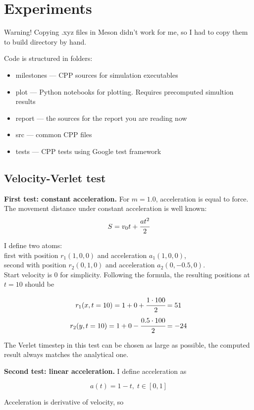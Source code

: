 \documentclass[12pt,a4paper]{article}
\begin{document}
\clearpage

\section{Experiments}
\label{experiments}

Warning! Copying .xyz files in Meson didn't work for me, so I had to copy them to build directory by hand.

Code is structured in folders:
\begin{itemize}
	\item milestones --- CPP sources for simulation executables
	\item plot --- Python notebooks for plotting. Requires precomputed simultion results
	\item report --- the sources for the report you are reading now
	\item src --- common CPP files
	\item tests --- CPP tests using Google test framework
\end{itemize}

\subsection*{Velocity-Verlet test}

{\bf First test: constant acceleration.} For $m=1.0$, acceleration is equal to force. The movement distance under constant acceleration is well known: \[ S = v_0 t + \cfrac{at^2}{2} \]

I define two atoms:\\
first with position $r_1(1, 0, 0)$ and acceleration $a_1(1, 0, 0)$,\\
second with position $r_2(0, 1, 0)$ and acceleration $a_2(0, -0.5, 0)$.\\
Start velocity is 0 for simplicity. Following the formula, the resulting positions at $t = 10$ should be

\[ r_1(x, t=10) = 1 + 0 + \cfrac{1 \cdot 100}{2} = 51 \]
\[ r_2(y, t=10) = 1 + 0 - \cfrac{0.5 \cdot 100}{2} = -24 \]

The Verlet timestep in this test can be chosen as large as possible, the computed result always matches the analytical one.

{\bf Second test: linear acceleration.} I define acceleration as

\[ a(t) = 1 - t,\; t \in [0, 1] \]

Acceleration is derivative of velocity, so
\end{document}
